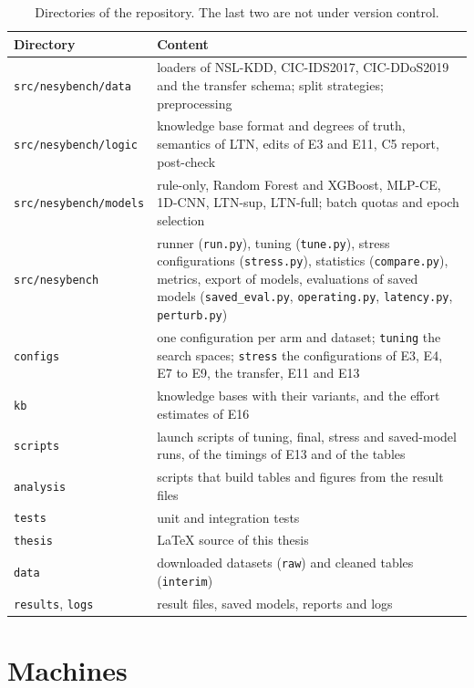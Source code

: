 \begin{table}[htbp]
\centering
\footnotesize
\caption{Directories of the repository. The last two are not under version control.}
\label{tab:app-layout}
\setlength{\tabcolsep}{4pt}
\begin{tabular}{@{}p{4.3cm}p{8.9cm}@{}}
\toprule
Directory & Content \\
\midrule
\texttt{src/nesybench/data} & loaders of NSL-KDD, CIC-IDS2017, CIC-DDoS2019 and the transfer schema; split strategies; preprocessing \\
\texttt{src/nesybench/logic} & knowledge base format and degrees of truth, semantics of LTN, edits of E3 and E11, C5 report, post-check \\
\texttt{src/nesybench/models} & rule-only, Random Forest and XGBoost, MLP-CE, 1D-CNN, LTN-sup, LTN-full; batch quotas and epoch selection \\
\texttt{src/nesybench} & runner (\texttt{run.py}), tuning (\texttt{tune.py}), stress configurations (\texttt{stress.py}), statistics (\texttt{compare.py}), metrics, export of models, evaluations of saved models (\texttt{saved\_eval.py}, \texttt{operating.py}, \texttt{latency.py}, \texttt{perturb.py}) \\
\texttt{configs} & one configuration per arm and dataset; \texttt{tuning} the search spaces; \texttt{stress} the configurations of E3, E4, E7 to E9, the transfer, E11 and E13 \\
\texttt{kb} & knowledge bases with their variants, and the effort estimates of E16 \\
\texttt{scripts} & launch scripts of tuning, final, stress and saved-model runs, of the timings of E13 and of the tables \\
\texttt{analysis} & scripts that build tables and figures from the result files \\
\texttt{tests} & unit and integration tests \\
\texttt{thesis} & \LaTeX{} source of this thesis \\
\texttt{data} & downloaded datasets (\texttt{raw}) and cleaned tables (\texttt{interim}) \\
\texttt{results}, \texttt{logs} & result files, saved models, reports and logs \\
\bottomrule
\end{tabular}
\end{table}

\FloatBarrier
\section{Machines}
\label{app:machines}

